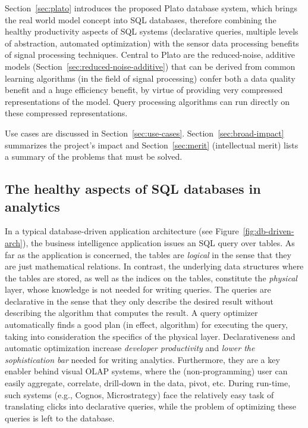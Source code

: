 Section~\ref{sec:plato} introduces the proposed Plato database system, which brings the real world model concept into SQL databases, therefore combining the healthy productivity aspects of SQL systems (declarative queries, multiple levels of abstraction, automated optimization) with the sensor data processing benefits of signal processing techniques. Central to Plato  are the reduced-noise, additive models (Section~\ref{sec:reduced-noise-additive}) that can be derived from common learning algorithms (in the field of signal processing) confer both a data quality benefit and a huge efficiency benefit, by virtue of providing very compressed representations of the model. Query processing algorithms can run directly on these compressed representations.

Use cases are discussed in Section~\ref{sec:use-cases}. Section~\ref{sec:broad-impact} summarizes the project's impact and Section~\ref{sec:merit} (intellectual merit) lists a summary of the problems that must be solved.
 
\subsection{The healthy aspects of SQL databases in analytics}
\label{sec:healthy-aspects}

In a typical database-driven application architecture (see Figure~\ref{fig:db-driven-arch}), the business intelligence application issues an SQL query over tables. As far as the application is concerned, the tables are {\em logical} in the sense that they are just mathematical relations. In contrast, the underlying data structures where the tables are stored, as well as the indices on the tables, constitute the {\em physical} layer, whose knowledge is not needed for writing queries. The queries are declarative in the sense that they only describe the desired result without describing the algorithm that computes the result. A query optimizer automatically finds a good plan (in effect, algorithm) for executing the query, taking into consideration the specifics of the physical layer. Declarativeness and automatic optimization increase {\em developer productivity} and {\em lower the sophistication bar} needed for writing analytics. Furthermore, they are a key enabler behind visual OLAP systems, where the (non-programming) user can easily aggregate, correlate, drill-down in the data, pivot, etc. During run-time, such systems (e.g., Cognos, Microstrategy) face the relatively easy task of translating clicks into declarative queries, while the problem of optimizing these queries is left to the database.

